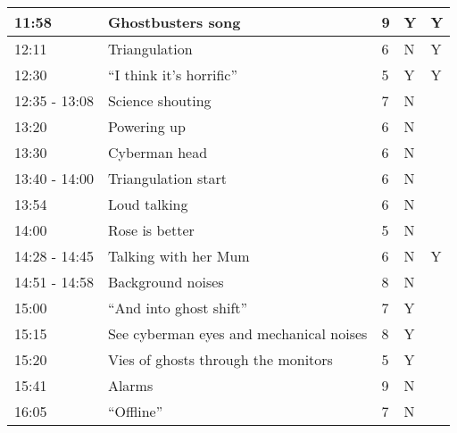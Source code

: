 \begin{longtable}{| p{70pt} | p{130pt} | p{45pt} | p{57pt} | p{60pt}|}
11:58           &           Ghostbusters song           &           9           &           Y          & Y          \\\hline
12:11           &           Triangulation           &           6           &           N          &Y           \\\hline
12:30           &           ``I think it's horrific''           &           5           &           Y          &Y           \\\hline
12:35 - 13:08           &           Science shouting           &           7           &           N          &           \\\hline
13:20           &           Powering up           &           6           &           N          &           \\\hline
13:30           &           Cyberman head           &           6           &           N          &           \\\hline
13:40 - 14:00           &           Triangulation start           &           6           &           N          &           \\\hline
13:54           &           Loud talking           &           6           &           N          &           \\\hline
14:00           &           Rose is better           &           5           &           N          &           \\\hline
14:28 - 14:45           &           Talking with her Mum           &           6           &           N          &Y           \\\hline
14:51 - 14:58           &           Background noises           &           8           &           N          &           \\\hline
15:00           &           ``And into ghost shift''           &           7           &           Y          &           \\\hline
15:15           &           See cyberman eyes and mechanical noises           &           8           &           Y          &           \\\hline
15:20           &           Vies of ghosts through the monitors           &           5           &           Y          &           \\\hline
15:41           &           Alarms           &           9           &           N          &           \\\hline
16:05           &           ``Offline''           &           7           &           N          &           \\\hline

\end{longtable}
